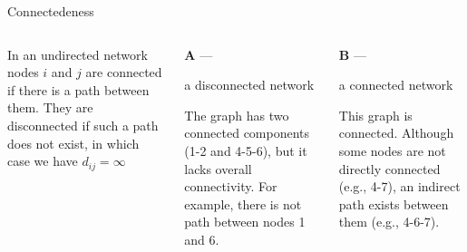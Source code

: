 \documentclass[aspectratio=1610]{beamer}
\begin{document}
\begin{frame}{Connectedeness}
	\begin{columns}
		\begin{column}{0.33\textwidth}
			In an undirected network nodes $i$ and $j$ are connected if
			there is a path between them. They are disconnected if
			such a path does not exist, in which case we have $d_{ij} = \infty$
		
		\end{column}
		\begin{column}{0.33\textwidth}

			\begin{center}

			\textbf{A} ---
			
			a disconnected network

			\vspace{1em}

			

			\end{center}

			\begin{footnotesize}
			The graph has two connected components (1-2 and 4-5-6),
			but it lacks overall connectivity. For example, there is
			not path between nodes 1 and 6.
			\end{footnotesize}

		\end{column}
		\begin{column}{0.33\textwidth}
			\begin{center}

			\textbf{B} ---
			
			a connected network

			\vspace{1em}

			

			\end{center}

			\begin{footnotesize}
			This graph is connected. Although 
			some nodes are not directly connected (e.g., 4-7), 
			an indirect path exists between them (e.g., 4-6-7). 
			\end{footnotesize}
			
		\end{column}
	\end{columns}
\end{frame}
\end{document}
